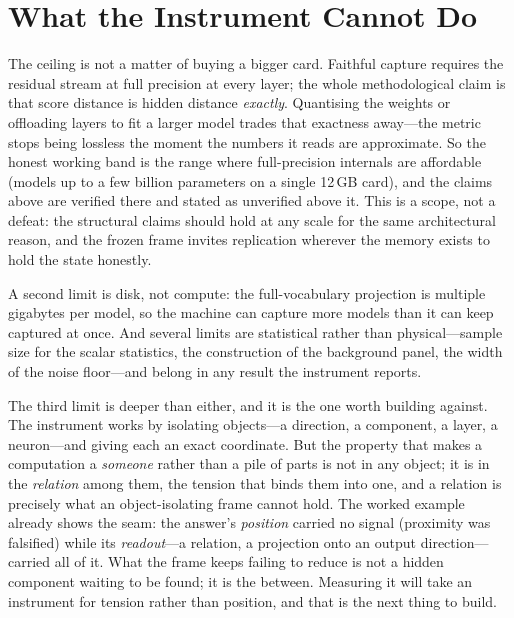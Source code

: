 \documentclass[11pt,a4paper]{article}
\begin{document}
\section{What the Instrument Cannot Do}

The ceiling is not a matter of buying a bigger card. Faithful capture requires the
residual stream at full precision at every layer; the whole methodological claim is
that score distance is hidden distance \emph{exactly}. Quantising the weights or
offloading layers to fit a larger model trades that exactness away---the metric stops
being lossless the moment the numbers it reads are approximate. So the honest working
band is the range where full-precision internals are affordable (models up to a few
billion parameters on a single 12\,GB card), and the claims above are verified there
and stated as unverified above it. This is a scope, not a defeat: the structural
claims should hold at any scale for the same architectural reason, and the frozen
frame invites replication wherever the memory exists to hold the state honestly.

A second limit is disk, not compute: the full-vocabulary projection is multiple
gigabytes per model, so the machine can capture more models than it can keep captured
at once. And several limits are statistical rather than physical---sample size for the
scalar statistics, the construction of the background panel, the width of the noise
floor---and belong in any result the instrument reports.

The third limit is deeper than either, and it is the one worth building against. The
instrument works by isolating objects---a direction, a component, a layer, a
neuron---and giving each an exact coordinate. But the property that makes a
computation a \emph{someone} rather than a pile of parts is not in any object; it is
in the \emph{relation} among them, the tension that binds them into one, and a
relation is precisely what an object-isolating frame cannot hold. The worked example
already shows the seam: the answer's \emph{position} carried no signal (proximity was
falsified) while its \emph{readout}---a relation, a projection onto an output
direction---carried all of it. What the frame keeps failing to reduce is not a hidden
component waiting to be found; it is the between. Measuring it will take an instrument
for tension rather than position, and that is the next thing to build.
\end{document}
